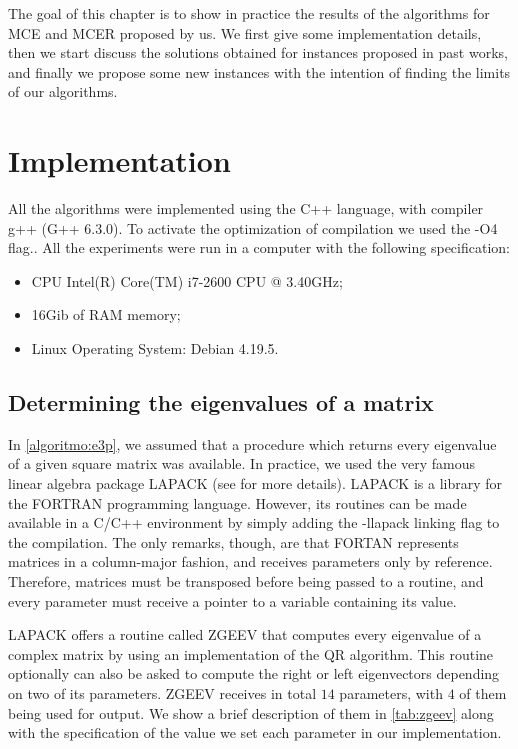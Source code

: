 The goal of this chapter is to show in practice the results of the algorithms for MCE and MCER proposed by us. We first give some implementation details, then we start discuss the solutions obtained for instances proposed in past works, and finally we propose some new instances with the intention of finding the limits of our algorithms.

\section{Implementation}

All the algorithms were implemented using the C++ language, with compiler g++ (G++ 6.3.0). To activate the optimization of compilation we used the -O4 flag.. All the experiments were run in a computer with the following specification:
\begin{itemize}
	\item CPU Intel(R) Core(TM) i7-2600 CPU @ 3.40GHz;
	\item 16Gib of RAM memory;
	\item Linux Operating System: Debian 4.19.5.
\end{itemize}
\subsection{Determining the eigenvalues of a matrix}

In \autoref{algoritmo:e3p}, we assumed that a procedure which returns every eigenvalue of a given square matrix was available. In practice, we used the very famous linear algebra package LAPACK (see  for more details).
LAPACK is a library for the FORTRAN programming language. However, its routines can be made available in a C/C++ environment by simply adding the -llapack linking flag to the compilation. The only remarks, though, are that FORTAN represents matrices in a column-major fashion, and receives parameters only by reference. Therefore, matrices must be transposed before being passed to a routine, and every parameter must receive a pointer to a variable containing its value.

LAPACK offers a routine called ZGEEV that computes every eigenvalue of a complex matrix by using an implementation of the QR algorithm. 
This routine optionally can also be asked to compute the right or left eigenvectors depending on two of its parameters. 
ZGEEV receives in total $14$ parameters, with $4$ of them being used for output. We show a brief description of them in \autoref{tab:zgeev} along with the specification of the value we set each parameter in our implementation.
\renewcommand{\arraystretch}{1.5}

